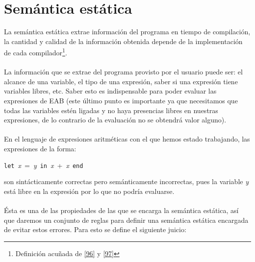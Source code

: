     \section{Semántica estática}
    La semántica estática extrae información del programa en tiempo de compilación, la cantidad y calidad de la información obtenida depende de la implementación de cada compilador\footnote{Definición acuñada de \hyperlink{96}{[96]} y \hyperlink{97}{[97]}}. \\\\
    La información que se extrae del programa provisto por el usuario puede ser: el alcance de una variable, el tipo de una expresión, saber si una expresión tiene variables libres, etc. Saber esto es indispensable  para poder evaluar las expresiones de \textsf{EAB} (este último punto es importante ya que necesitamos que todas las variables estén ligadas y no haya presencias libres en nuestras expresiones, de lo contrario de la evaluación no se obtendrá valor alguno).\\\\
    En el lenguaje de expresiones aritméticas con el que hemos estado trabajando, las expresiones de la forma:
        \begin{center}
                \texttt{let}\ \textit{x}\ =\ \textit{y}\ \texttt{in}\ \textit{x}\ +\ \textit{x}\ \texttt{end}
        \end{center}
    son sintácticamente correctas pero semánticamente incorrectas, pues la variable \textit{y} está libre en la expresión por lo que no podría evaluarse.\\\\
    Ésta es una de las propiedades de las que se encarga la semántica estática, así que daremos un conjunto de reglas para definir una semántica estática encargada de evitar estos errores. Para esto se define el siguiente juicio: 

    \bigskip
    
